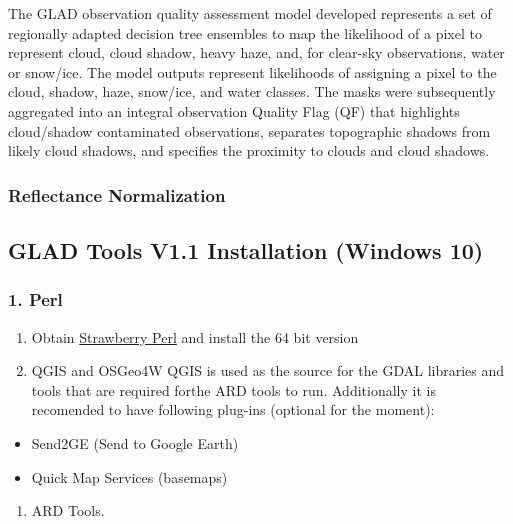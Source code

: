 \documentclass[]{article}
\providecommand{\tightlist}{%
  \setlength{\itemsep}{0pt}\setlength{\parskip}{0pt}}
\begin{document}
The GLAD observation quality assessment model developed represents a set
of regionally adapted decision tree ensembles to map the likelihood of a
pixel to represent cloud, cloud shadow, heavy haze, and, for clear-sky
observations, water or snow/ice. The model outputs represent likelihoods
of assigning a pixel to the cloud, shadow, haze, snow/ice, and water
classes. The masks were subsequently aggregated into an integral
observation Quality Flag (QF) that highlights cloud/shadow contaminated
observations, separates topographic shadows from likely cloud shadows,
and specifies the proximity to clouds and cloud shadows.

\hypertarget{reflectance-normalization}{%
\subsubsection{Reflectance
Normalization}\label{reflectance-normalization}}

\hypertarget{glad-tools-v1.1-installation-windows-10}{%
\subsection{GLAD Tools V1.1 Installation (Windows
10)}\label{glad-tools-v1.1-installation-windows-10}}

\hypertarget{perl}{%
\subsubsection{1. Perl}\label{perl}}

\begin{enumerate}
\def\labelenumi{\arabic{enumi}.}
\item
  Obtain \href{www.strawberryperl.com}{Strawberry Perl} and install the
  64 bit version
\item
  QGIS and OSGeo4W QGIS is used as the source for the GDAL libraries and
  tools that are required forthe ARD tools to run. Additionally it is
  recomended to have following plug-ins (optional for the moment):
\end{enumerate}

\begin{itemize}
\tightlist
\item
  Send2GE (Send to Google Earth)
\item
  Quick Map Services (basemaps)
\end{itemize}

\begin{enumerate}
\def\labelenumi{\arabic{enumi}.}
\setcounter{enumi}{2}
\tightlist
\item
  ARD Tools.
\end{enumerate}
\end{document}
